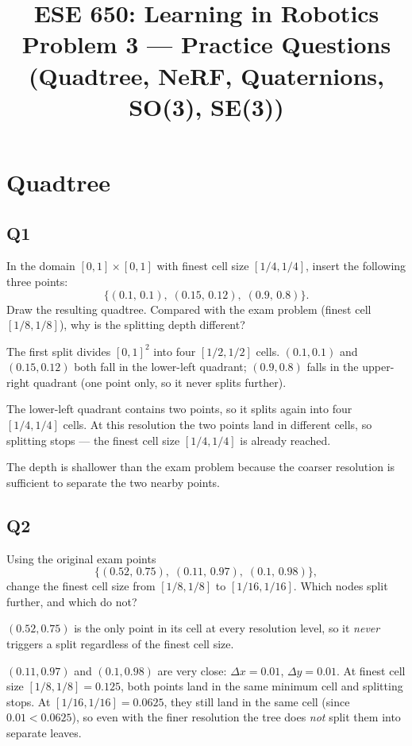 \documentclass[12pt]{article}
\title{\textbf{ESE 650: Learning in Robotics}\\
Problem 3 --- Practice Questions\\
(Quadtree, NeRF, Quaternions, SO(3), SE(3))}
\date{}
\begin{document}
\maketitle

\section*{Quadtree}

\subsection*{Q1}
In the domain $[0,1]\times[0,1]$ with finest cell size $[1/4, 1/4]$, insert the
following three points:
\[
  \{(0.1,\,0.1),\;(0.15,\,0.12),\;(0.9,\,0.8)\}.
\]
Draw the resulting quadtree. Compared with the exam problem (finest cell
$[1/8,1/8]$), why is the splitting depth different?

\begin{answerbox}
The first split divides $[0,1]^2$ into four $[1/2,1/2]$ cells.
$(0.1,0.1)$ and $(0.15,0.12)$ both fall in the lower-left quadrant; $(0.9,0.8)$
falls in the upper-right quadrant (one point only, so it never splits further).

The lower-left quadrant contains two points, so it splits again into four
$[1/4,1/4]$ cells.  At this resolution the two points land in different cells,
so splitting stops --- the finest cell size $[1/4,1/4]$ is already reached.

The depth is shallower than the exam problem because the coarser resolution is
sufficient to separate the two nearby points.
\end{answerbox}

\subsection*{Q2}
Using the original exam points
\[
  \{(0.52,\,0.75),\;(0.11,\,0.97),\;(0.1,\,0.98)\},
\]
change the finest cell size from $[1/8,1/8]$ to $[1/16,1/16]$.
Which nodes split further, and which do not?

\begin{answerbox}
$(0.52,0.75)$ is the only point in its cell at every resolution level, so it
\emph{never} triggers a split regardless of the finest cell size.

$(0.11,0.97)$ and $(0.1,0.98)$ are very close: $\Delta x = 0.01$,
$\Delta y = 0.01$.  At finest cell size $[1/8,1/8] = 0.125$, both points land
in the same minimum cell and splitting stops.  At $[1/16,1/16] = 0.0625$, they
still land in the same cell (since $0.01 < 0.0625$), so even with the finer
resolution the tree does \emph{not} split them into separate leaves.
\end{answerbox}
\end{document}
